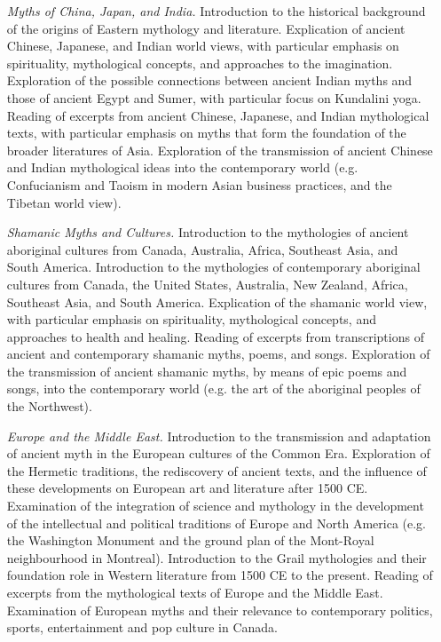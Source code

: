\documentclass[10pt,DIV09,letterpaper,oneside,headsepline]{scrreprt}
\begin{document}
\begin{itemize}
\item [\textit{Myths of China, Japan, and India.}] Introduction to the historical background of the origins of Eastern mythology and literature. Explication of ancient Chinese, Japanese, and Indian world views, with particular emphasis on spirituality, mythological concepts, and approaches to the imagination. Exploration of the possible connections between ancient Indian myths and those of ancient Egypt and Sumer, with particular focus on Kundalini yoga. Reading of excerpts from ancient Chinese, Japanese, and Indian mythological texts, with particular emphasis on myths that form the foundation of the broader literatures of Asia. Exploration of the transmission of ancient Chinese and Indian mythological ideas into the contemporary world (e.g. Confucianism and Taoism in modern Asian business practices, and the Tibetan world view).

\item [\textit{Shamanic Myths and Cultures.}] Introduction to the mythologies of ancient aboriginal cultures from Canada, Australia, Africa, Southeast Asia, and South America. Introduction to the mythologies of contemporary aboriginal cultures from Canada, the United States, Australia, New Zealand, Africa, Southeast Asia, and South America. Explication of the shamanic world view, with particular emphasis on spirituality, mythological concepts, and approaches to health and healing. Reading of excerpts from transcriptions of ancient and contemporary shamanic myths, poems, and songs. Exploration of the transmission of ancient shamanic myths, by means of epic poems and songs, into the contemporary world (e.g. the art of the aboriginal peoples of the Northwest).

\item [\textit{Europe and the Middle East.}] Introduction to the transmission and adaptation of ancient myth in the European cultures of the Common Era. Exploration of the Hermetic traditions, the rediscovery of ancient texts, and the influence of these developments on European art and literature after 1500 CE. Examination of the integration of science and mythology in the development of the intellectual and political traditions of Europe and North America (e.g. the Washington Monument and the ground plan of the Mont-Royal neighbourhood in Montreal). Introduction to the Grail mythologies and their foundation role in Western literature from 1500 CE to the present. Reading of excerpts from the mythological texts of Europe and the Middle East. Examination of European myths and their relevance to contemporary politics, sports, entertainment and pop culture in Canada.


\end{itemize}
\end{document}
